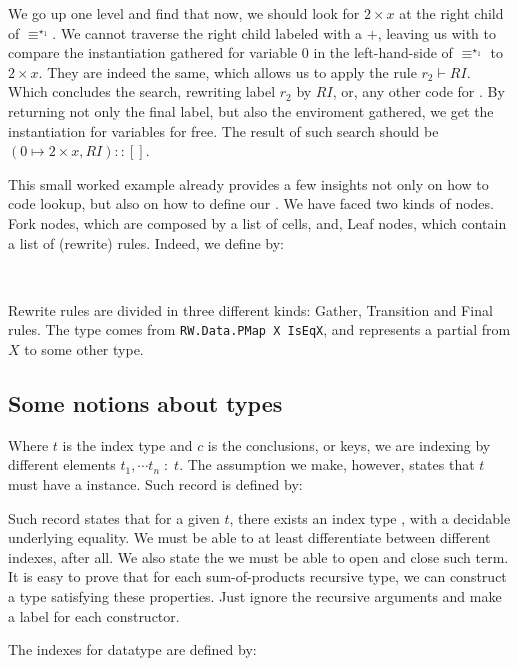 We go up one level and find that
now, we should look for $2 \times x$ at the right child of $\equiv^{\star_1}$. We cannot traverse the
right child labeled with a $+$, leaving us with to compare the instantiation gathered for
variable 0 in the left-hand-side of $\equiv^{\star_1}$ to $2 \times x$. They are indeed the same,
which allows us to apply the rule $r_2 \vdash RI$. Which concludes the search, rewriting label $r_2$
by $RI$, or, any other code for . By returning not only the final label, but
also the enviroment gathered, we get the instantiation for variables for free.
The result of such search should be $(0 \mapsto 2 \times x , RI) :: []$.

This small worked example already provides a few insights not only on how to code lookup, but
also on how to define our \mytrie. We have faced two kinds of nodes. Fork nodes, which
are composed by a list of cells, and, Leaf nodes, which contain a list of (rewrite) rules.
Indeed, we define \mytrie by:

\\

Rewrite rules are divided in three different kinds: Gather, Transition and Final rules.
The type  comes from \texttt{\scriptsize RW.Data.PMap X IsEqX}, and represents a partial
from $X$ to some other type.

\subsection{Some notions about types}

Where $t$ is the index type and $c$ is the conclusions, or keys, we are indexing by different
elements $t_1, \cdots t_n\; :\; t$. The assumption we make, however, states that $t$ must
have a  instance. Such record is defined by:


Such record states that for a given $t$, there exists an index type , with a decidable
underlying equality. We must be able to at least differentiate between different indexes, after all.
We also state the we must be able to open and close such term. It is easy to prove that for each
sum-of-products recursive type, we can construct a type  satisfying these properties.
Just ignore the recursive arguments and make a label for each constructor.

The indexes for  datatype are defined by:

